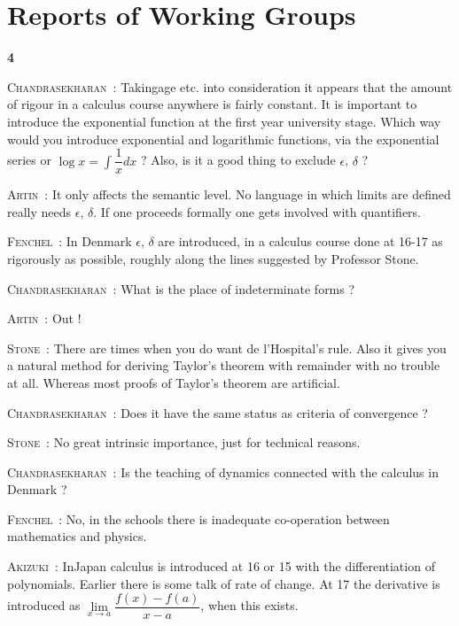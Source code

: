 \chapter{Reports of Working Groups}

\begin{center}
{\large\bf 4}
\end{center}
\medskip

\setcounter{pageoriginal}{184}
\noindent
\textsc{Chandrasekharan}~: Taking\pageoriginale age etc. into consideration it appears that the amount of rigour in a calculus course anywhere is fairly constant. It is important to introduce the exponential function at the first year university stage. Which way would you introduce exponential and logarithmic functions, via the exponential series or $\log x = \int \dfrac{1}{x}dx$ ? Also, is it a good thing to exclude $\epsilon$, $\delta$ ?

\smallskip
\noindent
\textsc{Artin}~: It only affects the semantic level. No language in which limits are defined really needs $\epsilon$, $\delta$. If one proceeds formally one gets involved with quantifiers.

\smallskip
\noindent
\textsc{Fenchel}~: In Denmark $\epsilon$, $\delta$ are introduced, in a calculus course done at 16-17 as rigorously as possible, roughly along the lines suggested by Professor Stone.

\smallskip
\noindent
\textsc{Chandrasekharan}~: What is the place of indeterminate forms ?

\smallskip
\noindent
\textsc{Artin}~: Out !

\smallskip
\noindent
\textsc{Stone}~: There are times when you do want de l'Hospital's rule. Also it gives you a natural method for deriving Taylor's theorem with remainder with no trouble at all. Whereas most proofs of Taylor's theorem are artificial.

\smallskip
\noindent
\textsc{Chandrasekharan}~: Does it have the same status as criteria of convergence ?

\smallskip
\noindent
\textsc{Stone}~: No great intrinsic importance, just for technical reasons.

\smallskip
\noindent
\textsc{Chandrasekharan}~: Is the teaching of dynamics connected with the calculus in Denmark ?

\smallskip
\noindent
\textsc{Fenchel}~: No, in the schools there is inadequate co-operation between mathematics and physics.

\smallskip
\noindent
\textsc{Akizuki}~: In\pageoriginale Japan calculus is introduced at 16 or 15 with the differentiation of polynomials. Earlier there is some talk of rate of change. At 17 the derivative is introduced as $\lim\limits_{x\to a} \dfrac{f(x)-f(a)}{x-a}$, when this exists.

